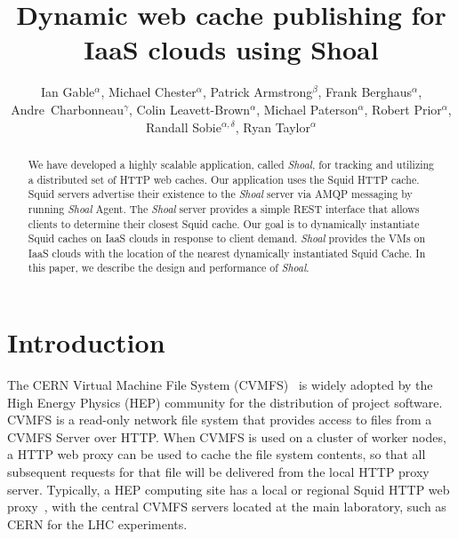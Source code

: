 \documentclass[a4paper]{jpconf}
\begin{document}
\def\shoal{{\it Shoal}\xspace}

\title{Dynamic web cache publishing for IaaS clouds using Shoal}

\author{Ian Gable$^\alpha$, 
Michael Chester$^\alpha$,
Patrick Armstrong$^\beta$,
Frank Berghaus$^\alpha$,
Andre~Charbonneau$^\gamma$,
Colin Leavett-Brown$^\alpha$, 
Michael Paterson$^\alpha$, 
Robert Prior$^\alpha$, 
Randall Sobie$^{\alpha,\delta}$, 
Ryan Taylor$^\alpha$}

\address{$\alpha$: Department of Physics and Astronomy, University of Victoria, Victoria, Canada\\
$\beta$: Computation Institute, University of Chicago, Chicago, USA\\
$\gamma$: Shared Services Canada, Ottawa, Canada\\
$\delta$: Institute of Particle Physics of Canada
}



\begin{abstract}

We have developed a highly scalable application, called \shoal, for tracking and 
utilizing a distributed set of HTTP web caches. 
Our application uses the Squid HTTP cache.
Squid servers advertise their existence to the \shoal server via AMQP messaging by running \shoal
Agent.
The \shoal server provides a simple REST interface that allows clients to
determine their closest Squid cache.
Our goal is to dynamically instantiate Squid caches on IaaS
clouds in response to client demand.
\shoal provides the VMs on IaaS clouds with the location of the nearest 
dynamically instantiated Squid Cache.
In this paper, we describe the design and performance of \shoal. 
 
\end{abstract}



\section{Introduction}


The CERN Virtual Machine File System (CVMFS)~\cite{ref:cvmfs}
is widely adopted by the High Energy Physics (HEP) community for
the distribution of project software.
CVMFS is a read-only network file system that provides access to files from a CVMFS
Server over HTTP.
When CVMFS is used on a cluster of worker nodes, a HTTP web proxy 
can be used to cache the file system contents, so that all subsequent requests 
for that file will be delivered from the local HTTP proxy server. 
Typically, a HEP computing site has a local or regional Squid HTTP 
web proxy~\cite{ref:squidproxy}, with the central CVMFS servers located at 
the main laboratory, such as CERN for the LHC experiments.
\end{document}
